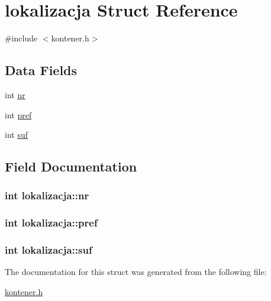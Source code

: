 \hypertarget{structlokalizacja}{}\section{lokalizacja Struct Reference}
\label{structlokalizacja}


{\ttfamily \#include $<$kontener.\+h$>$}

\subsection*{Data Fields}
\begin{DoxyCompactItemize}
\item 
int \hyperlink{structlokalizacja_ab3185685591101d81cb357c8117290fd}{nr}
\item 
int \hyperlink{structlokalizacja_a2900f7e89911bfea0e279125b066926b}{pref}
\item 
int \hyperlink{structlokalizacja_aec1dc6d104a7f16a3b58870e29fe48d1}{suf}
\end{DoxyCompactItemize}


\subsection{Field Documentation}
\hypertarget{structlokalizacja_ab3185685591101d81cb357c8117290fd}{}
\subsubsection[{nr}]{\setlength{\rightskip}{0pt plus 5cm}int lokalizacja\+::nr}\label{structlokalizacja_ab3185685591101d81cb357c8117290fd}
\hypertarget{structlokalizacja_a2900f7e89911bfea0e279125b066926b}{}
\subsubsection[{pref}]{\setlength{\rightskip}{0pt plus 5cm}int lokalizacja\+::pref}\label{structlokalizacja_a2900f7e89911bfea0e279125b066926b}
\hypertarget{structlokalizacja_aec1dc6d104a7f16a3b58870e29fe48d1}{}
\subsubsection[{suf}]{\setlength{\rightskip}{0pt plus 5cm}int lokalizacja\+::suf}\label{structlokalizacja_aec1dc6d104a7f16a3b58870e29fe48d1}


The documentation for this struct was generated from the following file\+:\begin{DoxyCompactItemize}
\item 
\hyperlink{kontener_8h}{kontener.\+h}\end{DoxyCompactItemize}
